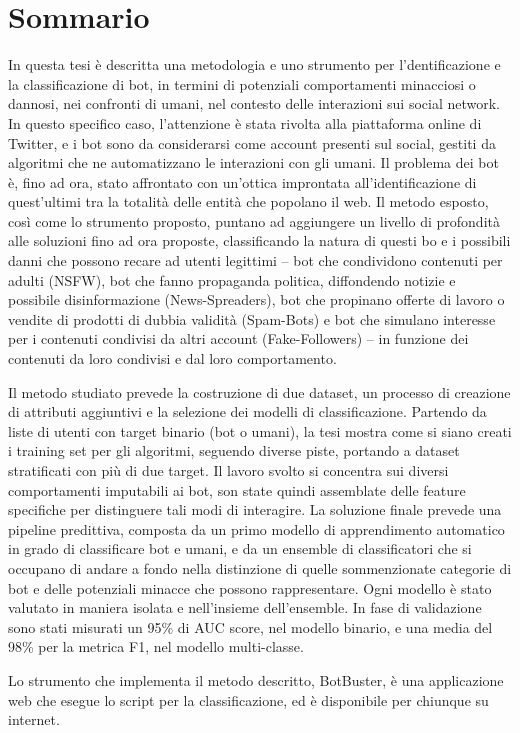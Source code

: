 \newpage
\chapter*{Sommario}


In questa tesi è descritta una metodologia e uno strumento per l'dentificazione e la classificazione di bot, in termini di potenziali comportamenti minacciosi o dannosi, nei confronti di umani, nel contesto delle interazioni sui social network.
In questo specifico caso, l'attenzione è stata rivolta alla piattaforma online di Twitter, e i bot sono da considerarsi come account presenti sul social, gestiti da algoritmi che ne automatizzano le interazioni con gli umani.
Il problema dei bot è, fino ad ora, stato affrontato con un'ottica improntata all'identificazione di quest'ultimi tra la totalità delle entità che popolano il web.
Il metodo esposto, così come lo strumento proposto, puntano ad aggiungere un livello di profondità alle soluzioni fino ad ora proposte, classificando la natura di questi bo e i possibili danni che possono recare ad utenti legittimi -- bot che condividono contenuti per adulti (NSFW), bot che fanno propaganda politica, diffondendo notizie e possibile disinformazione (News-Spreaders), bot che propinano offerte di lavoro o vendite di prodotti di dubbia validità (Spam-Bots) e bot che simulano interesse per i contenuti condivisi da altri account (Fake-Followers) -- in funzione dei contenuti da loro condivisi e dal loro comportamento.

Il metodo studiato prevede la costruzione di due dataset, un processo di creazione di attributi aggiuntivi e la selezione dei modelli di classificazione.
Partendo da liste di utenti con target binario (bot o umani), la tesi mostra come si siano creati i training set per gli algoritmi, seguendo diverse piste, portando a dataset stratificati con più di due target.
Il lavoro svolto si concentra sui diversi comportamenti imputabili ai bot, son state quindi assemblate delle feature specifiche per distinguere tali modi di interagire.
La soluzione finale prevede una pipeline predittiva, composta da un primo modello di apprendimento automatico in grado di classificare bot e umani, e da un ensemble di classificatori che si occupano di andare a fondo nella distinzione di quelle sommenzionate categorie di bot e delle potenziali minacce che possono rappresentare.
Ogni modello è stato valutato in maniera isolata e nell'insieme dell'ensemble. In fase di validazione sono stati misurati un 95\% di AUC score, nel modello binario, e una media del 98\% per la metrica F1, nel modello multi-classe.

Lo strumento che implementa il metodo descritto, BotBuster, è una applicazione web che esegue lo script per la classificazione, ed è disponibile per chiunque su internet.
